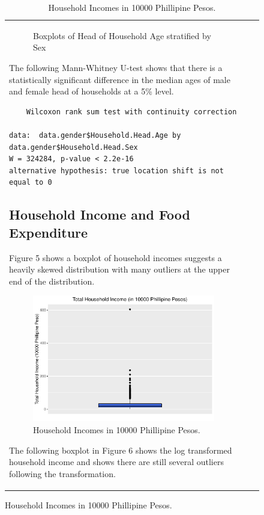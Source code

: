 \documentclass[
]{article}
\begin{document}
\begin{figure}[H]
\begin{table}[H]
\begin{tabular}[t]{lrr}
\begin{figure}
{}

\caption{Boxplots of Head of Household Age stratified by Sex}\label{fig:boxplot of age by gender}
\end{figure}

The following Mann-Whitney U-test shows that there is a statistically
significant difference in the median ages of male and female head of
households at a 5\% level.

\begin{verbatim}
    Wilcoxon rank sum test with continuity correction

data:  data.gender$Household.Head.Age by data.gender$Household.Head.Sex
W = 324284, p-value < 2.2e-16
alternative hypothesis: true location shift is not equal to 0
\end{verbatim}

\hypertarget{household-income-and-food-expenditure}{%
\subsection{Household Income and Food
Expenditure}\label{household-income-and-food-expenditure}}

Figure 5 shows a boxplot of household incomes suggests a heavily skewed
distribution with many outliers at the upper end of the distribution.

\begin{figure}[H]

{\centering \includegraphics[width=0.8\linewidth]{Group_01_Project2_demo_files/figure-latex/balance boxplot-1} 

}

\caption{Household Incomes in 10000 Phillipine Pesos.}\label{fig:balance boxplot}
\end{figure}

The following boxplot in Figure 6 shows the log transformed household
income and shows there are still several outliers following the
transformation.


\end{tabular}
\end{table}
\end{figure}
\end{document}
